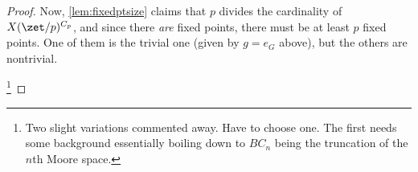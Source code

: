 \begin{proof}
Now, \cref{lem:fixedptsize} claims that $p$ divides the cardinality of $X(\zet/p)^{C_p}$, and since there \emph{are} fixed points, there must be at least $p$ fixed points.
One of them is the trivial one (given by $g=e_G$ above), but the others are nontrivial.


\footnote{Two slight variations commented away.  Have to choose one.  The first needs some background essentially boiling down to $BC_n$ being the truncation of the $n$th Moore space.



}
\end{proof}
